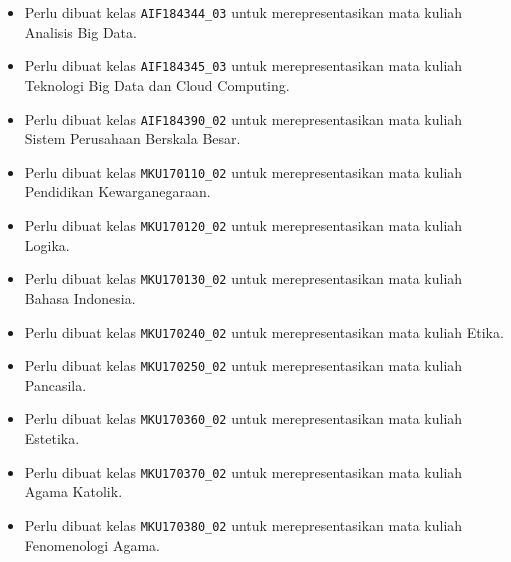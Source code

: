 \begin{enumerate}
\begin{itemize}
		\item Perlu dibuat kelas \texttt{AIF184344\_03} untuk merepresentasikan mata kuliah Analisis Big Data.
		\item Perlu dibuat kelas \texttt{AIF184345\_03} untuk merepresentasikan mata kuliah Teknologi Big Data dan Cloud Computing.
		\item Perlu dibuat kelas \texttt{AIF184390\_02} untuk merepresentasikan mata kuliah Sistem Perusahaan Berskala Besar.
		\item Perlu dibuat kelas \texttt{MKU170110\_02} untuk merepresentasikan mata kuliah Pendidikan Kewarganegaraan.
		\item Perlu dibuat kelas \texttt{MKU170120\_02} untuk merepresentasikan mata kuliah Logika.
		\item Perlu dibuat kelas \texttt{MKU170130\_02} untuk merepresentasikan mata kuliah Bahasa Indonesia.
		\item Perlu dibuat kelas \texttt{MKU170240\_02} untuk merepresentasikan mata kuliah Etika.
		\item Perlu dibuat kelas \texttt{MKU170250\_02} untuk merepresentasikan mata kuliah Pancasila.
		\item Perlu dibuat kelas \texttt{MKU170360\_02} untuk merepresentasikan mata kuliah Estetika.
		\item Perlu dibuat kelas \texttt{MKU170370\_02} untuk merepresentasikan mata kuliah Agama Katolik.
		\item Perlu dibuat kelas \texttt{MKU170380\_02} untuk merepresentasikan mata kuliah Fenomenologi Agama.
	\end{itemize}
	

\end{enumerate}
